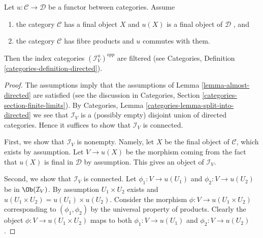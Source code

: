 \begin{lemma}
\label{lemma-directed}
Let $u : \mathcal{C} \to \mathcal{D}$ be a functor between categories.
Assume
\begin{enumerate}
\item the category $\mathcal{C}$ has a final object $X$ and
$u(X)$ is a final object of $\mathcal{D}$ , and
\item the category $\mathcal{C}$ has fibre products and
$u$ commutes with them.
\end{enumerate}
Then the index categories $(\mathcal{I}^u_V)^{opp}$ are filtered (see
Categories, Definition \ref{categories-definition-directed}).
\end{lemma}

\begin{proof}
The assumptions imply that the assumptions of
Lemma \ref{lemma-almost-directed}
are satisfied (see the discussion in
Categories, Section \ref{categories-section-finite-limits}).
By
Categories, Lemma \ref{categories-lemma-split-into-directed}
we see that $\mathcal{I}_V$ is a (possibly empty) disjoint union of
directed categories.
Hence it suffices to show that $\mathcal{I}_V$ is connected.

\medskip\noindent
First, we show that $\mathcal{I}_V$ is nonempty.
Namely, let $X$ be the final object of $\mathcal{C}$,
which exists by assumption.
Let $V \to u(X)$ be the morphism coming from the fact
that $u(X)$ is final in $\mathcal{D}$ by assumption.
This gives an object of $\mathcal{I}_V$.

\medskip\noindent
Second, we show that $\mathcal{I}_V$ is connected.
Let $\phi_1 : V \to u(U_1)$ and $\phi_2 : V \to u(U_2)$ be
in $\Ob(\mathcal{I}_V)$. By assumption $U_1\times U_2$
exists and $u(U_1\times U_2) = u(U_1)\times u(U_2)$.
Consider the morphism $\phi : V \to u(U_1\times U_2)$
corresponding to $(\phi_1, \phi_2)$ by the universal property
of products. Clearly the object $\phi : V \to u(U_1\times U_2)$
maps to both $\phi_1 : V \to u(U_1)$ and $\phi_2 : V \to u(U_2)$.
\end{proof}

